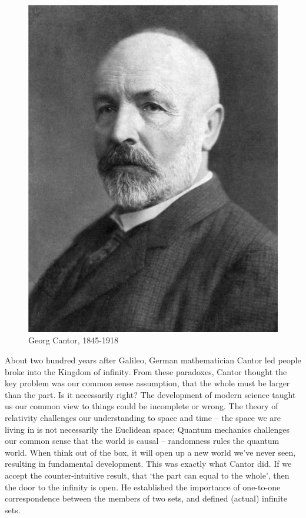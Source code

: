 \documentclass{article}
\begin{document}
\begin{figure}
 \centering
 \includegraphics[scale=0.5]{img/Cantor.png}
 \captionsetup{labelformat=empty}
 \caption{Georg Cantor, 1845-1918}
 \label{fig:Cantor}
\end{figure}

About two hundred years after Galileo, German mathematician Cantor led people broke into the Kingdom of infinity. From these paradoxes, Cantor thought the key problem was our common sense assumption, that the whole must be larger than the part. Is it necessarily right? The development of modern science taught us our common view to things could be incomplete or wrong. The theory of relativity challenges our understanding to space and time -- the space we are living in is not necessarily the Euclidean space; Quantum mechanics challenges our common sense that the world is causal -- randomness rules the quantum world. When think out of the box, it will open up a new world we've never seen, resulting in fundamental development. This was exactly what Cantor did. If we accept the counter-intuitive result, that `the part can equal to the whole', then the door to the infinity is open. He established the importance of one-to-one correspondence between the members of two sets, and defined (actual) infinite sets.
\end{document}
